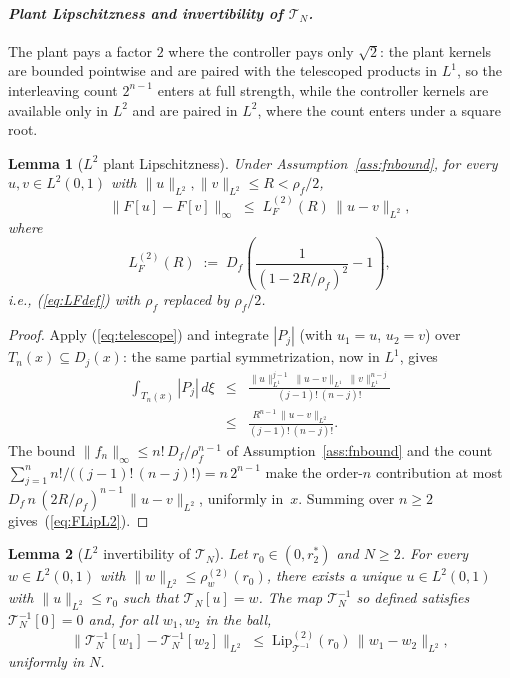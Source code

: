 \documentclass[amsthm]{autart}
\theoremstyle{plain}
\newtheorem{lemma}{Lemma}
\theoremstyle{definition}
\newcommand{\Tcal}{\mathcal{T}}
\newcommand{\Ltwo}{L^2}
\newcommand{\LipT}{\mathrm{Lip}_{\Tcal^{-1}}}
\begin{document}
\paragraph*{\normalfont\em Plant Lipschitzness and invertibility of $\Tcal_N$.}
The plant pays a factor $2$ where the controller pays only $\sqrt{2}$: the plant kernels are bounded pointwise and are paired with the telescoped products in $L^1$, so the interleaving count $2^{n-1}$ enters at full strength, while the controller kernels are available only in $\Ltwo$ and are paired in $\Ltwo$, where the count enters under a square root.

\begin{lemma}[$\Ltwo$ plant Lipschitzness]\label{lem:FLipL2}
Under Assumption~\ref{ass:fnbound}, for every $u, v \in \Ltwo(0,1)$ with $\|u\|_{\Ltwo}, \|v\|_{\Ltwo} \le R < \rho_f/2$,
\begin{equation}
\|F[u] - F[v]\|_\infty \;\le\; L_F^{(2)}(R)\,\|u - v\|_{\Ltwo},
\label{eq:FLipL2}
\end{equation}
where
\begin{equation}
L_F^{(2)}(R) \;:=\; D_f\!\left(\frac{1}{(1 - 2R/\rho_f)^2} - 1\right),
\label{eq:LF2def}
\end{equation}
i.e., (\ref{eq:LFdef}) with $\rho_f$ replaced by $\rho_f/2$.
\end{lemma}

\begin{proof}
Apply (\ref{eq:telescope}) and integrate $|P_j|$ (with $u_1 = u$, $u_2 = v$) over $T_n(x) \subseteq D_j(x)$: the same partial symmetrization, now in $L^1$, gives
\begin{eqnarray}
\int_{T_n(x)} |P_j|\, d\xi &\le& \frac{\|u\|_{L^1}^{j-1}\; \|u - v\|_{L^1}\; \|v\|_{L^1}^{n-j}}{(j-1)!\,(n-j)!} \nonumber \\
&\le& \frac{R^{n-1}\,\|u - v\|_{\Ltwo}}{(j-1)!\,(n-j)!}.
\label{eq:blockL1}
\end{eqnarray}
The bound $\|f_n\|_\infty \le n!\, D_f/\rho_f^{n-1}$ of Assumption~\ref{ass:fnbound} and the count $\sum_{j=1}^n n!/\bigl((j-1)!\,(n-j)!\bigr) = n\, 2^{n-1}$ make the order-$n$ contribution at most $D_f\, n\, (2R/\rho_f)^{n-1}\, \|u - v\|_{\Ltwo}$, uniformly in~$x$. Summing over $n \ge 2$ gives~(\ref{eq:FLipL2}).
\end{proof}

\begin{lemma}[$\Ltwo$ invertibility of $\Tcal_N$]\label{lem:TNinv}
Let $r_0 \in (0, r_2^*)$ and $N \ge 2$. For every $w \in \Ltwo(0,1)$ with $\|w\|_{\Ltwo} \le \rho_w^{(2)}(r_0)$, there exists a unique $u \in \Ltwo(0,1)$ with $\|u\|_{\Ltwo} \le r_0$ such that $\Tcal_N[u] = w$. The map $\Tcal_N^{-1}$ so defined satisfies $\Tcal_N^{-1}[0] = 0$ and, for all $w_1, w_2$ in the ball,
\begin{equation}
\bigl\|\Tcal_N^{-1}[w_1] - \Tcal_N^{-1}[w_2]\bigr\|_{\Ltwo} \;\le\; \LipT^{(2)}(r_0)\, \|w_1 - w_2\|_{\Ltwo},
\label{eq:TNinvLip}
\end{equation}
uniformly in $N$.
\end{lemma}
\end{document}

